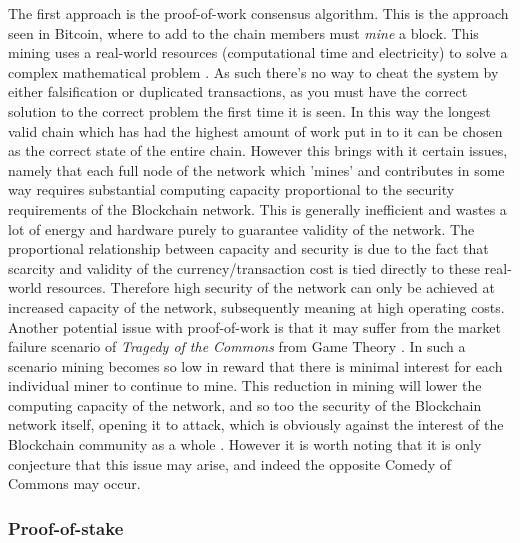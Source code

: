\documentclass{article}
\begin{document}
The first approach is the proof-of-work consensus algorithm. This is the approach seen in Bitcoin, where to add to the chain members must \emph{mine} a block. This mining uses a real-world resources (computational time and electricity) to solve a complex mathematical problem \parencite{nakamoto2008bitcoin}. As such there's no way to cheat the system by either falsification or duplicated transactions, as you must have the correct solution to the correct problem the first time it is seen. In this way the longest valid chain which has had the highest amount of work put in to it can be chosen as the correct state of the entire chain. However this brings with it certain issues, namely that each full node of the network which 'mines' and contributes in some way requires substantial computing capacity proportional to the security requirements of the Blockchain network. This is generally inefficient and wastes a lot of energy and hardware purely to guarantee validity of the network. The proportional relationship between capacity and security is due to the fact that scarcity and validity of the currency/transaction cost is tied directly to these real-world resources. Therefore high security of the network can only be achieved at increased capacity of the network, subsequently meaning at high operating costs. Another potential issue with proof-of-work is that it may suffer from the market failure scenario of \emph{Tragedy of the Commons} from Game Theory \parencite{garrett_hardin_tragedy_1968, Iftxlimi23:online, economic46:online}. In such a scenario mining becomes so low in reward that there is minimal interest for each individual miner to continue to mine. This reduction in mining will lower the computing capacity of the network, and so too the security of the Blockchain network itself, opening it to attack, which is obviously against the interest of the Blockchain community as a whole \parencite{Bitcoinw83:online}. However it is worth noting that it is only conjecture that this issue may arise, and indeed the opposite Comedy of Commons \parencite{rose1986comedy} may occur.

\subsubsection{Proof-of-stake}
\end{document}
